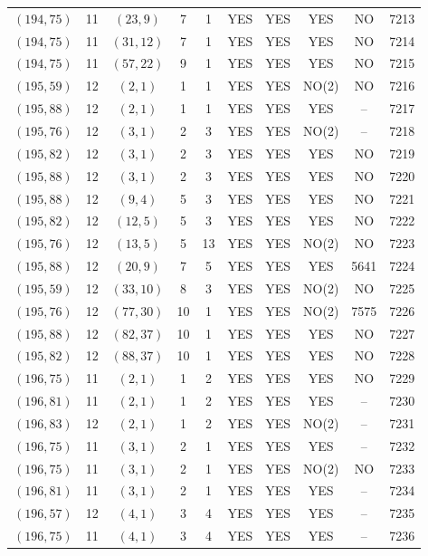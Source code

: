 \begin{longtable}{|c|c|c|c|c|c|c|c|c|c|}
$(194, 75)$ & 11 & $(23, 9)$ & 7 & 1 & YES & YES & YES & NO & 7213\\
$(194, 75)$ & 11 & $(31, 12)$ & 7 & 1 & YES & YES & YES & NO & 7214\\
$(194, 75)$ & 11 & $(57, 22)$ & 9 & 1 & YES & YES & YES & NO & 7215\\
$(195, 59)$ & 12 & $(2, 1)$ & 1 & 1 & YES & YES & NO(2) & NO & 7216\\
$(195, 88)$ & 12 & $(2, 1)$ & 1 & 1 & YES & YES & YES & -- & 7217\\
$(195, 76)$ & 12 & $(3, 1)$ & 2 & 3 & YES & YES & NO(2) & -- & 7218\\
$(195, 82)$ & 12 & $(3, 1)$ & 2 & 3 & YES & YES & YES & NO & 7219\\
$(195, 88)$ & 12 & $(3, 1)$ & 2 & 3 & YES & YES & YES & NO & 7220\\
$(195, 88)$ & 12 & $(9, 4)$ & 5 & 3 & YES & YES & YES & NO & 7221\\
$(195, 82)$ & 12 & $(12, 5)$ & 5 & 3 & YES & YES & YES & NO & 7222\\
$(195, 76)$ & 12 & $(13, 5)$ & 5 & 13 & YES & YES & NO(2) & NO & 7223\\
$(195, 88)$ & 12 & $(20, 9)$ & 7 & 5 & YES & YES & YES & 5641 & 7224\\
$(195, 59)$ & 12 & $(33, 10)$ & 8 & 3 & YES & YES & NO(2) & NO & 7225\\
$(195, 76)$ & 12 & $(77, 30)$ & 10 & 1 & YES & YES & NO(2) & 7575 & 7226\\
$(195, 88)$ & 12 & $(82, 37)$ & 10 & 1 & YES & YES & YES & NO & 7227\\
$(195, 82)$ & 12 & $(88, 37)$ & 10 & 1 & YES & YES & YES & NO & 7228\\
$(196, 75)$ & 11 & $(2, 1)$ & 1 & 2 & YES & YES & YES & NO & 7229\\
$(196, 81)$ & 11 & $(2, 1)$ & 1 & 2 & YES & YES & YES & -- & 7230\\
$(196, 83)$ & 12 & $(2, 1)$ & 1 & 2 & YES & YES & NO(2) & -- & 7231\\
$(196, 75)$ & 11 & $(3, 1)$ & 2 & 1 & YES & YES & YES & -- & 7232\\
$(196, 75)$ & 11 & $(3, 1)$ & 2 & 1 & YES & YES & NO(2) & NO & 7233\\
$(196, 81)$ & 11 & $(3, 1)$ & 2 & 1 & YES & YES & YES & -- & 7234\\
$(196, 57)$ & 12 & $(4, 1)$ & 3 & 4 & YES & YES & YES & -- & 7235\\
$(196, 75)$ & 11 & $(4, 1)$ & 3 & 4 & YES & YES & YES & -- & 7236\\

\end{longtable}
